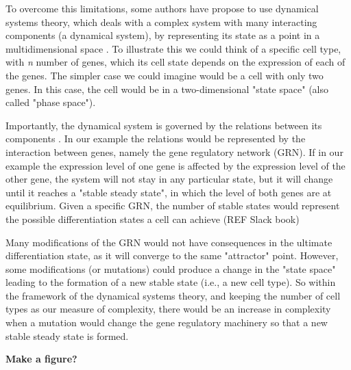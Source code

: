 To overcome this limitations, some authors have propose to use dynamical systems theory, which deals with a complex system with many interacting components (a dynamical system), by representing its state as a point in a multidimensional space \citep{Alberch1991,ForgacsandStuartA.Newman.2005,Jaeger2014devmech}. 
To illustrate this we could think of a specific cell type, with \textit{n} number of genes, which its cell state depends on the expression of each of the genes.
The simpler case we could imagine would be a cell with only two genes. In this case, the cell would be in a two-dimensional "state space" (also called "phase space").

Importantly, the dynamical system is governed by the relations between its components \citep{ForgacsandStuartA.Newman.2005}. In our example the relations would be represented by the interaction between genes, namely the gene regulatory network (GRN). 
If in our example the expression level of one gene is affected by the expression level of the other gene, the system will not stay in any particular state, but it will change until it reaches a "stable steady state", in which the level of both genes are at equilibrium. 
Given a specific GRN, the number of stable states would represent the possible differentiation states a cell can achieve (REF Slack book)

Many modifications of the GRN would not have consequences in the ultimate differentiation state, as it will converge to the same "attractor" point.
However, some modifications (or mutations) could produce a change in the "state space" leading to the formation of a new stable state (i.e., a new cell type).
So within the framework of the dynamical systems theory, and keeping the number of cell types as our measure of complexity, there would be an increase in complexity when a mutation would change the gene regulatory machinery so that a new stable steady state is formed.


\textbf{Make a figure?}

